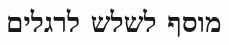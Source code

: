 \documentclass[twoside, openany, parskip=half, 11pt]{book}
\begin{document}
\ashrei

\uvaletzion

\chapter[מוסף לשלש רגלים]{ מוסף לשלש לרגלים ‎}
\label{musaphregel}


\specialsaavos

\specialsameisim

\nextpage
\end{document}
